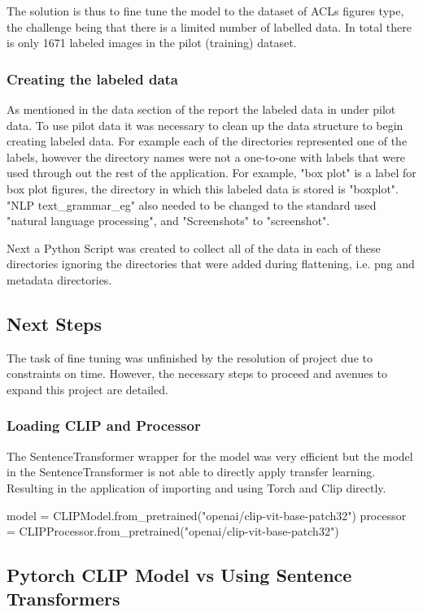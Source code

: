 \documentclass[letterpaper, 10 pt, conference]{ieeeconf}  %
\begin{document}
The solution is thus to fine tune the model to the dataset of ACLs figures type, the
challenge being that there is a limited number of labelled data. In total there is only
1671 labeled images in the pilot (training) dataset. 

\subsubsection{Creating the labeled data}
As mentioned in the data section of the report the labeled data in under pilot data. To use pilot data it was necessary to clean up the data structure to begin creating labeled data. For example each of the directories represented one of the labels, however the directory names were not a one-to-one with labels that were used through out the rest of the application. For example, "box plot" is a label for box plot figures, the directory in which this labeled data is stored is "boxplot". "NLP text\_grammar\_eg" also needed to be changed to the standard used "natural language processing", and "Screenshots" to "screenshot".

Next a Python Script was created to collect all of the data in each of these directories ignoring the directories that were added during flattening, i.e. png and metadata directories. 

\subsection{Next Steps}
The task of fine tuning was unfinished by the resolution of project due to constraints on time. However, the 
necessary steps to proceed and avenues to expand this project are detailed.

\subsubsection{Loading CLIP and Processor}
The SentenceTransformer wrapper for the model was very efficient but the model in the SentenceTransformer is not able to directly apply transfer learning.
Resulting in the application of importing and using Torch and Clip directly. 
\begin{python}
model =
  CLIPModel.from_pretrained("openai/clip-vit-base-patch32")
processor = 
  CLIPProcessor.from_pretrained("openai/clip-vit-base-patch32")
\end{python}
\subsection{Pytorch CLIP Model vs Using Sentence Transformers}
\end{document}
